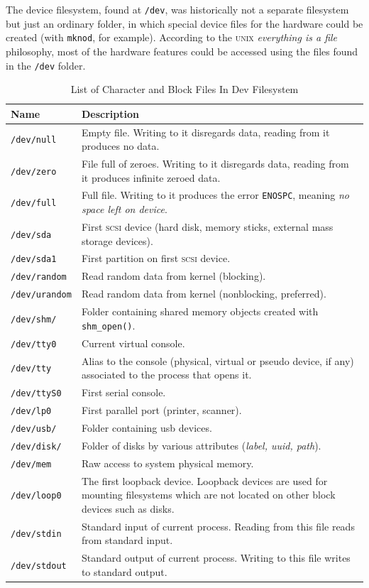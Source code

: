 \documentclass[a4paper]{article}
\begin{document}
The device filesystem, found at \verb|/dev|, was historically not a separate filesystem but just an ordinary folder, in which special device files for the hardware could be created (with \verb|mknod|, for example). According to the \textsc{unix} \emph{everything is a file} philosophy, most of the hardware features could be accessed using the files found in the \verb|/dev| folder.

\begin{table}
\renewcommand{\arraystretch}{1.25}
\centering\caption{List of Character and Block Files In Dev Filesystem}\label{tbl:devfs}
\begin{tabular}{@{}lp{8cm}@{}}
\toprule
Name & Description\\
\midrule
\texttt{/dev/null} & Empty file. Writing to it disregards data, reading from it produces no data.\\
\texttt{/dev/zero} & File full of zeroes. Writing to it disregards data, reading from it produces infinite zeroed data.\\
\texttt{/dev/full} & Full file. Writing to it produces the error \verb|ENOSPC|, meaning \emph{no space left on device}.\\
\texttt{/dev/sda} & 
First \textsc{scsi} device (hard disk, memory sticks, external mass storage devices).\\
\texttt{/dev/sda1} & First partition on first \textsc{scsi} device.\\
\texttt{/dev/random} & Read random data from kernel (blocking).\\
\texttt{/dev/urandom} & Read random data from kernel (nonblocking, preferred).\\
\texttt{/dev/shm/} & Folder containing shared memory objects created with \verb|shm_open()|.\\
\texttt{/dev/tty0} & Current virtual console.\\
\texttt{/dev/tty} & Alias to the console (physical, virtual or pseudo device, if any) associated to the process that opens it.\\
\texttt{/dev/ttyS0} & First serial console.\\
\texttt{/dev/lp0} & First parallel port (printer, scanner).\\
\texttt{/dev/usb/} & Folder containing \gls{usb} devices.\\
\texttt{/dev/disk/} & Folder of disks by various attributes (\emph{label, uuid, path}).\\
\texttt{/dev/mem} & Raw access to system physical memory.\\
\texttt{/dev/loop0} & The first loopback device. Loopback devices are used for mounting filesystems which are not located on other block devices such as disks.\\
\texttt{/dev/stdin} & Standard input of current process. Reading from this file reads from standard input.\\
\texttt{/dev/stdout} & Standard output of current process. Writing to this file writes to standard output.\\
\bottomrule
\end{tabular}
\end{table}
\end{document}
